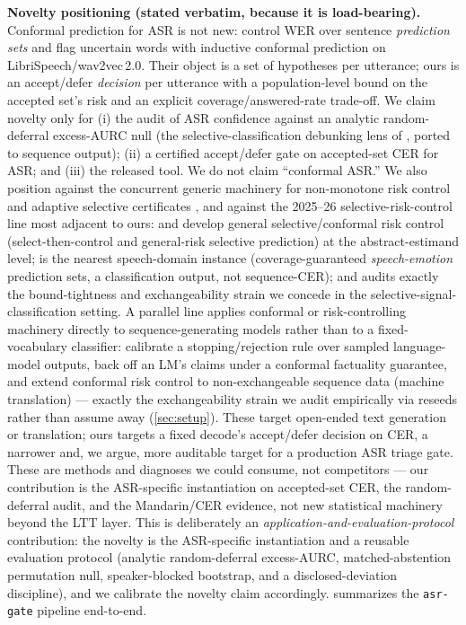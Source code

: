 \documentclass[11pt]{article}
\begin{document}
\textbf{Novelty positioning (stated verbatim, because it is load-bearing).}
Conformal prediction for ASR is not new: \citet{ernez2023conformal} control
WER over sentence \emph{prediction sets} and flag uncertain words with inductive
conformal prediction on LibriSpeech/wav2vec\,2.0. Their object is a set of
hypotheses per utterance; ours is an accept/defer \emph{decision} per utterance
with a population-level bound on the accepted set's risk and an explicit
coverage/answered-rate trade-off. We claim novelty only for (i) the audit of ASR
confidence against an analytic random-deferral excess-AURC null (the
selective-classification debunking lens of \citet{traub2024selective}, ported to
sequence output); (ii) a certified accept/defer gate on accepted-set CER for ASR;
and (iii) the released tool. We do not claim ``conformal ASR.'' We also
position against the concurrent generic machinery for non-monotone risk control
\citep{angelopoulos2026nonmonotone} and adaptive selective certificates
\citep{yu2026joint}, and against the 2025--26 selective-risk-control line most adjacent
to ours: \citet{xu2025scrc} and \citet{bai2026conformalselective} develop
general selective/conformal risk control (select-then-control and general-risk
selective prediction) at the abstract-estimand level; \citet{jia2025coverageser} is the
nearest speech-domain instance (coverage-guaranteed \emph{speech-emotion} prediction
sets, a classification output, not sequence-CER); and \citet{zhou2026falsesafety}
audits exactly the bound-tightness and exchangeability strain we concede in the
selective-signal-classification setting. A parallel line applies conformal or
risk-controlling machinery directly to sequence-generating models rather than to a
fixed-vocabulary classifier: \citet{quach2024conformallm} calibrate a stopping/rejection
rule over sampled language-model outputs, \citet{mohri2024conformalfactuality} back off
an LM's claims under a conformal factuality guarantee, and \citet{farinhas2024nonexchangeable}
extend conformal risk control to non-exchangeable sequence data (machine translation) ---
exactly the exchangeability strain we audit empirically via reseeds rather than assume
away (\cref{sec:setup}). These target open-ended text generation or translation; ours
targets a fixed decode's accept/defer decision on CER, a narrower and, we argue, more
auditable target for a production ASR triage gate. These are methods and diagnoses we could
consume, not competitors --- our contribution is the ASR-specific instantiation on
accepted-set CER, the random-deferral audit, and the Mandarin/CER evidence, not new
statistical machinery beyond the LTT layer. This is deliberately an
\emph{application-and-evaluation-protocol} contribution: the novelty is the ASR-specific
instantiation and a reusable evaluation protocol (analytic random-deferral excess-AURC,
matched-abstention permutation null, speaker-blocked bootstrap, and a disclosed-deviation
discipline), and we calibrate the novelty claim accordingly.
 summarizes the \texttt{asr-gate} pipeline end-to-end.
\end{document}
